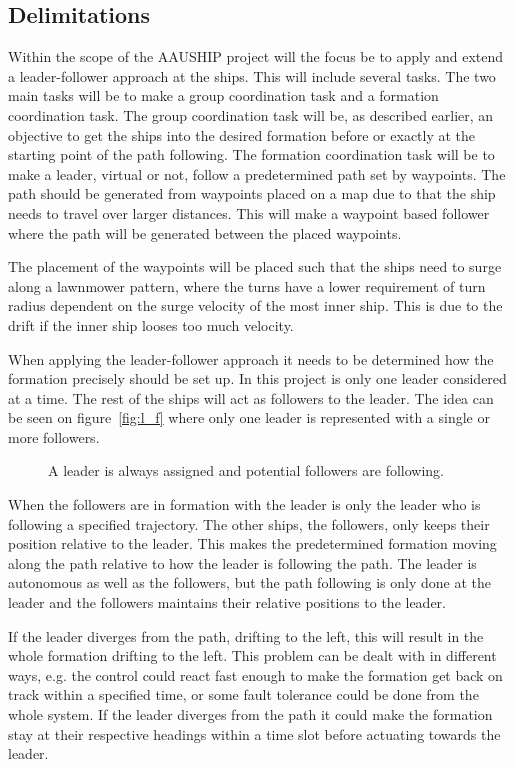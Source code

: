 \subsection{Delimitations}
Within the scope of the AAUSHIP project will the focus be to apply and extend a leader-follower approach at the ships. This will include several tasks. The two main tasks will be to make a group coordination task and a formation coordination task. The group coordination task will be, as described earlier, an objective to get the ships into the desired formation before or exactly at the starting point of the path following. The formation coordination task will be to make a leader, virtual or not, follow a predetermined path set by waypoints. The path should be generated from waypoints placed on a map due to that the ship needs to travel over larger distances. This will make a waypoint based follower where the path will be generated between the placed waypoints.

The placement of the waypoints will be placed such that the ships need to surge along a lawnmower pattern, where the turns have a lower requirement of turn radius dependent on the surge velocity of the most inner ship. This is due to the drift if the inner ship looses too much velocity.

When applying the leader-follower approach it needs to be determined how the formation precisely should be set up. In this project is only one leader considered at a time. The rest of the ships will act as followers to the leader. The idea can be seen on figure~\vref{fig:l_f} where only one leader is represented with a single or more followers.
\begin{figure}[htbp]
	\centering
	
	\caption{A leader is always assigned and potential followers are following.}
	\label{fig:l_f}
\end{figure}
When the followers are in formation with the leader is only the leader who is following a specified trajectory. The other ships, the followers, only keeps their position relative to the leader. This makes the predetermined formation moving along the path relative to how the leader is following the path. The leader is autonomous as well as the followers, but the path following is only done at the leader and the followers maintains their relative positions to the leader.

If the leader diverges from the path, drifting to the left, this will result in the whole formation drifting to the left. This problem can be dealt with in different ways, e.g. the control could react fast enough to make the formation get back on track within a specified time, or some fault tolerance could be done from the whole system. If the leader diverges from the path it could make the formation stay at their respective headings within a time slot before actuating towards the leader.

